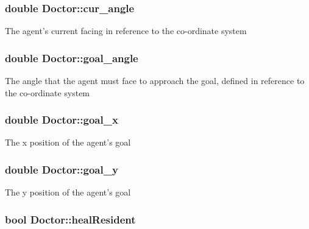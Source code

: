 \hypertarget{classDoctor_ab67e7a3eab1a57a0cfa52d84fe52414d}{
\subsubsection[{cur\-\_\-angle}]{\setlength{\rightskip}{0pt plus 5cm}double Doctor\-::cur\-\_\-angle\hspace{0.3cm}{\ttfamily [protected]}}}\label{classDoctor_ab67e7a3eab1a57a0cfa52d84fe52414d}
The agent's current facing in reference to the co-\/ordinate system \hypertarget{classDoctor_a27377808d49670322af2ce4ec34730f1}{
\subsubsection[{goal\-\_\-angle}]{\setlength{\rightskip}{0pt plus 5cm}double Doctor\-::goal\-\_\-angle\hspace{0.3cm}{\ttfamily [protected]}}}\label{classDoctor_a27377808d49670322af2ce4ec34730f1}
The angle that the agent must face to approach the goal, defined in reference to the co-\/ordinate system \hypertarget{classDoctor_ae058c3d6dce31d71ac4e63e3fd653275}{
\subsubsection[{goal\-\_\-x}]{\setlength{\rightskip}{0pt plus 5cm}double Doctor\-::goal\-\_\-x\hspace{0.3cm}{\ttfamily [protected]}}}\label{classDoctor_ae058c3d6dce31d71ac4e63e3fd653275}
The x position of the agent's goal \hypertarget{classDoctor_aba0c1163551f144834fc0d68c556fac2}{
\subsubsection[{goal\-\_\-y}]{\setlength{\rightskip}{0pt plus 5cm}double Doctor\-::goal\-\_\-y\hspace{0.3cm}{\ttfamily [protected]}}}\label{classDoctor_aba0c1163551f144834fc0d68c556fac2}
The y position of the agent's goal \hypertarget{classDoctor_adab6ec6a93ee2f58b436a8294120f295}{
\subsubsection[{heal\-Resident}]{\setlength{\rightskip}{0pt plus 5cm}bool Doctor\-::heal\-Resident\hspace{0.3cm}{\ttfamily [protected]}}}\label{classDoctor_adab6ec6a93ee2f58b436a8294120f295}
